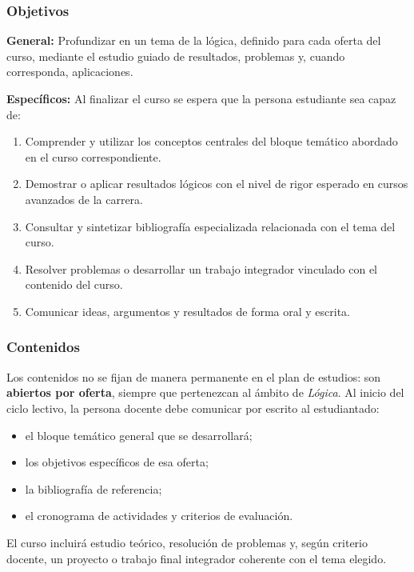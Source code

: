 \begin{refsection}
\subsubsection*{Objetivos}

\textbf{General:} Profundizar en un tema de la lógica, definido para cada oferta del curso, mediante el estudio guiado de resultados, problemas y, cuando corresponda, aplicaciones.

\textbf{Específicos:} Al finalizar el curso se espera que la persona estudiante sea capaz de:

\begin{enumerate}
\item Comprender y utilizar los conceptos centrales del bloque temático abordado en el curso correspondiente.
\item Demostrar o aplicar resultados lógicos con el nivel de rigor esperado en cursos avanzados de la carrera.
\item Consultar y sintetizar bibliografía especializada relacionada con el tema del curso.
\item Resolver problemas o desarrollar un trabajo integrador vinculado con el contenido del curso.
\item Comunicar ideas, argumentos y resultados de forma oral y escrita.
\end{enumerate}

\subsubsection*{Contenidos}

Los contenidos no se fijan de manera permanente en el plan de estudios: son \textbf{abiertos por oferta}, siempre que pertenezcan al ámbito de \emph{Lógica}. Al inicio del ciclo lectivo, la persona docente debe comunicar por escrito al estudiantado:

\begin{itemize}
\item el bloque temático general que se desarrollará;
\item los objetivos específicos de esa oferta;
\item la bibliografía de referencia;
\item el cronograma de actividades y criterios de evaluación.
\end{itemize}

El curso incluirá estudio teórico, resolución de problemas y, según criterio docente, un proyecto o trabajo final integrador coherente con el tema elegido.


\end{refsection}
